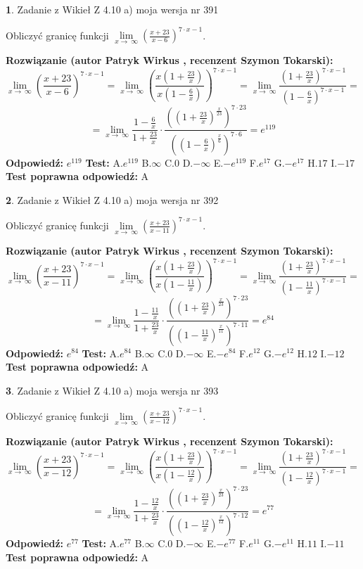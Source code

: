 \documentclass[12pt, a4paper]{article}
\theoremstyle{definition} %
\newtheorem{zad}{}
\newcommand{\zadStart}[1]{\begin{zad}#1\newline}
\newcommand{\zadStop}{\end{zad}}
\newcommand{\rozwStart}[2]{\noindent \textbf{Rozwiązanie (autor #1 , recenzent #2): }\newline}
\newcommand{\rozwStop}{\newline}
\newcommand{\odpStart}{\noindent \textbf{Odpowiedź:}\newline}
\newcommand{\odpStop}{\newline}
\newcommand{\testStart}{\noindent \textbf{Test:}\newline}
\newcommand{\testStop}{\newline}
\newcommand{\kluczStart}{\noindent \textbf{Test poprawna odpowiedź:}\newline}
\newcommand{\kluczStop}{\newline}
\begin{document}
\zadStart{Zadanie z Wikieł Z 4.10 a) moja wersja nr 391}

Obliczyć granicę funkcji  $\lim\limits_{x\to\ \infty}(\frac{x+23}{x-6})^{7\cdot x-1}$.
\zadStop
\rozwStart{Patryk Wirkus}{Szymon Tokarski}
$$\lim\limits_{x\to\ \infty}(\frac{x+23}{x-6})^{7\cdot x-1} = \lim\limits_{x\to\ \infty}(\frac{x(1+\frac{23}{x})}{x(1-\frac{6}{x})})^{7\cdot x-1}=\lim\limits_{x\to\ \infty}\frac{(1+\frac{23}{x})^{7\cdot x-1}}{(1-\frac{6}{x})^{7\cdot x-1}}=$$
$$=\lim\limits_{x\to\ \infty}\frac{1-\frac{6}{x}}{1+\frac{23}{x}}\cdot\frac{((1+\frac{23}{x})^{\frac{x}{23}})^{7\cdot23}}{((1-\frac{6}{x})^{\frac{x}{6}})^{7\cdot6}}=e^{119}$$
\rozwStop
\odpStart
$e^{119}$
\odpStop
\testStart
A.$e^{119}$ B.$\infty$ C.$0$ D.$-\infty$ E.$-e^{119}$
F.$e^{17}$ G.$-e^{17}$
H.$17$
I.$-17$
\testStop
\kluczStart
A
\kluczStop



\zadStart{Zadanie z Wikieł Z 4.10 a) moja wersja nr 392}

Obliczyć granicę funkcji  $\lim\limits_{x\to\ \infty}(\frac{x+23}{x-11})^{7\cdot x-1}$.
\zadStop
\rozwStart{Patryk Wirkus}{Szymon Tokarski}
$$\lim\limits_{x\to\ \infty}(\frac{x+23}{x-11})^{7\cdot x-1} = \lim\limits_{x\to\ \infty}(\frac{x(1+\frac{23}{x})}{x(1-\frac{11}{x})})^{7\cdot x-1}=\lim\limits_{x\to\ \infty}\frac{(1+\frac{23}{x})^{7\cdot x-1}}{(1-\frac{11}{x})^{7\cdot x-1}}=$$
$$=\lim\limits_{x\to\ \infty}\frac{1-\frac{11}{x}}{1+\frac{23}{x}}\cdot\frac{((1+\frac{23}{x})^{\frac{x}{23}})^{7\cdot23}}{((1-\frac{11}{x})^{\frac{x}{11}})^{7\cdot11}}=e^{84}$$
\rozwStop
\odpStart
$e^{84}$
\odpStop
\testStart
A.$e^{84}$ B.$\infty$ C.$0$ D.$-\infty$ E.$-e^{84}$
F.$e^{12}$ G.$-e^{12}$
H.$12$
I.$-12$
\testStop
\kluczStart
A
\kluczStop



\zadStart{Zadanie z Wikieł Z 4.10 a) moja wersja nr 393}

Obliczyć granicę funkcji  $\lim\limits_{x\to\ \infty}(\frac{x+23}{x-12})^{7\cdot x-1}$.
\zadStop
\rozwStart{Patryk Wirkus}{Szymon Tokarski}
$$\lim\limits_{x\to\ \infty}(\frac{x+23}{x-12})^{7\cdot x-1} = \lim\limits_{x\to\ \infty}(\frac{x(1+\frac{23}{x})}{x(1-\frac{12}{x})})^{7\cdot x-1}=\lim\limits_{x\to\ \infty}\frac{(1+\frac{23}{x})^{7\cdot x-1}}{(1-\frac{12}{x})^{7\cdot x-1}}=$$
$$=\lim\limits_{x\to\ \infty}\frac{1-\frac{12}{x}}{1+\frac{23}{x}}\cdot\frac{((1+\frac{23}{x})^{\frac{x}{23}})^{7\cdot23}}{((1-\frac{12}{x})^{\frac{x}{12}})^{7\cdot12}}=e^{77}$$
\rozwStop
\odpStart
$e^{77}$
\odpStop
\testStart
A.$e^{77}$ B.$\infty$ C.$0$ D.$-\infty$ E.$-e^{77}$
F.$e^{11}$ G.$-e^{11}$
H.$11$
I.$-11$
\testStop
\kluczStart
A
\kluczStop
\end{document}
